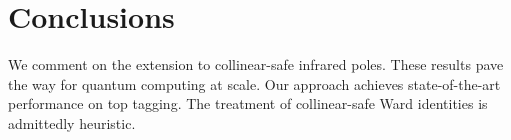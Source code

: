 \section{Conclusions}\label{sec:conclusions}

We comment on the extension to collinear-safe infrared poles. These
results pave the way for quantum computing at scale. Our approach
achieves state-of-the-art performance on top tagging. The treatment of
collinear-safe Ward identities is admittedly heuristic.

